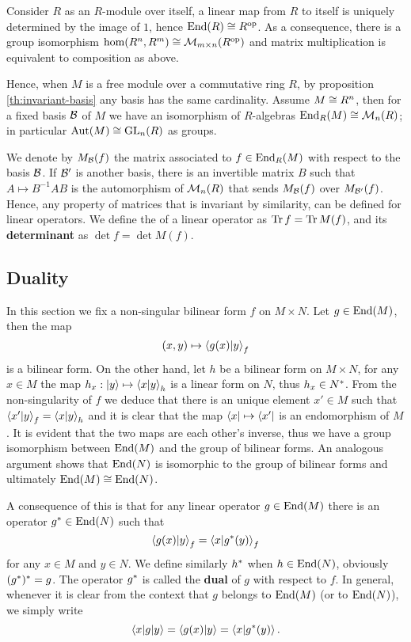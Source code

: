Consider $R$ as an $R$-module over itself, a linear map from $R$ to
itself is uniquely determined by the image of $1$, hence $\operatorname{End}(R)\cong
R^{\mathrm{op}}$. As a consequence, there is a group isomorphism
$\hom(R^n,R^m)\cong\operatorname{\mathcal{M}}_{m\times n}(R^{\mathrm{op}})$ and matrix multiplication
is equivalent to composition as above.

Hence, when $M$ is a free module over a commutative ring $R$, by
proposition \ref{th:invariant-basis} any basis has the same
cardinality. Assume $M\cong R^n$, then for a fixed basis $\mathcal{B}$
of $M$ we have an isomorphism of $R$-algebras
$\operatorname{End}_R(M)\cong\operatorname{\mathcal{M}}_n(R)$; in particular $\operatorname{Aut}(M)\cong\operatorname{GL}_n(R)$ as
groups.

We denote by $M_{\mathcal{B}}(f)$ the matrix associated to
$f\in\operatorname{End}_R(M)$ with respect to the basis $\mathcal{B}$.  If
$\mathcal{B'}$ is another basis, there is an invertible matrix $B$ such
that $A\mapsto B^{-1}AB$ is the automorphism of $\operatorname{\mathcal{M}}_n(R)$ that sends
$M_{\mathcal{B}}(f)$ over $M_{\mathcal{B'}}(f)$. Hence, any property of
matrices that is invariant by similarity, can be defined for linear
operators. We define the  of a linear operator as
$\operatorname{Tr} f = \operatorname{Tr} M(f)$, and its \textbf{determinant} as
$\det f = \det M(f)$.


\subsection{Duality}
\label{sec:linear-algebra:duality}
In this section we fix a non-singular bilinear form $f$ on $M\times
N$. Let $g\in\operatorname{End}(M)$, then the map
\[(x,y) \mapsto \left\langle g(x) \middle| y \right\rangle_f\] is a bilinear
form. On the other hand, let $h$ be a bilinear form on $M\times N$,
for any $x\in M$ the map $h_x : \left\lvert y \right\rangle \mapsto \left\langle x \middle| y \right\rangle_h$
is a linear form on $N$, thus $h_x\in N^\ast$. From the
non-singularity of $f$ we deduce that there is an unique element
$x'\in M$ such that $\left\langle x' \middle| y \right\rangle_f=\left\langle x \middle| y \right\rangle_h$ and it is
clear that the map $\left\langle x \right\rvert\mapsto \left\langle x' \right\rvert$ is an endomorphism of
$M$. It is evident that the two maps are each other's inverse, thus we
have a group isomorphism between $\operatorname{End}(M)$ and the group of bilinear
forms. An analogous argument shows that $\operatorname{End}(N)$ is isomorphic to the
group of bilinear forms and ultimately $\operatorname{End}(M)\cong\operatorname{End}(N)$.

A consequence of this is that for any linear operator $g\in\operatorname{End}(M)$
there is an operator $g^\ast\in\operatorname{End}(N)$ such that
\[\left\langle g(x) \middle| y \right\rangle_f = \left\langle x \middle| g^\ast(y) \right\rangle_f\]
for any $x\in M$ and $y\in N$. We define similarly $h^\ast$ when
$h\in\operatorname{End}(N)$, obviously $(g^\ast)^\ast = g$. The operator
$g^\ast$ is called the \textbf{dual} of $g$
with respect to $f$. In general, whenever it is clear from the context
that $g$ belongs to $\operatorname{End}(M)$ (or to $\operatorname{End}(N)$), we simply write
\[\left\langle x \middle| g \middle| y \right\rangle = \left\langle g(x) \middle| y \right\rangle = \left\langle x \middle| g^\ast(y) \right\rangle\text{.}\]

